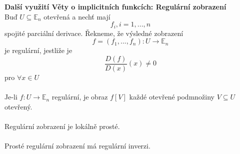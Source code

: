 \documentclass{article}
\begin{document}
\textbf{Další využití Věty o implicitních funkcích: Regulární zobrazení}\\
Buď $U \subseteq \mathbb{E}_{n}$ otevřená a nechť mají
$$ f_{i}, i = 1, ..., n$$
spojité parciální derivace. Řekneme, že výsledné zobrazení
$$ f = (f_{1},...,f_{n}) : U \rightarrow \mathbb{E}_{n}$$
je regulární, jestliže je
$$\frac{D(f)}{D(x)}(x) \neq 0$$
pro $\forall x \in U$\\\\
Je-li $f: U \rightarrow \mathbb{E}_{n}$ regulární, je obraz $f[V]$ každé otevřené podmnožiny
$V \subseteq U$ otevřený.\\\\
Regulární zobrazení je lokálně prosté.\\\\
Prosté regulární zobrazení má regulární inverzi.
\end{document}
